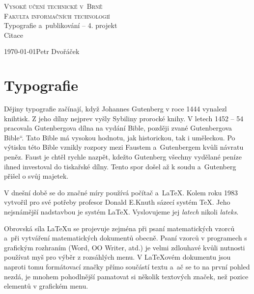 \documentclass[a4paper, 11pt]{article}
\newcommand{\myuv}[1]{\quotedblbase #1\textquotedblleft}
\begin{document}
\begin{titlepage}
\begin{center}
{\Huge  \textsc{Vysoké učení technické v~Brně}} \\ 
\medskip
{\huge \textsc{Fakulta informačních technologií}} \\ 
{\LARGE Typografie a~publikování -- 4. projekt}\\
\medskip
{\Huge Citace}
{}
\end{center}
{\Large { \today \hfill Petr Dvořáček}}\\
\end{titlepage}


\section{Typografie}



Dějiny typografie začínají, když Johannes Gutenberg v roce 1444 vynalezl knihtisk. \citep{Rybicka:Latex} Z jeho dílny nejprev vyšly Sybiliny prorocké knihy. V letech 1452 – 54 pracovala Gutenbergova dílna na vydání Bible, později zvané \myuv{Gutenbergova Bible}. Tato Bible má vysokou hodnotu, jak historickou, tak i uměleckou. Po výtisku této Bible vznikly rozpory mezi Faustem a~Gutenbergem kvůli návratu peněz. Faust je chtěl rychle nazpět, kdežto Gutenberg všechny vydělané peníze ihned investoval do tiskařské dílny. Tento spor došel až k soudu a~Gutenberg přišel o svůj majetek. \citep{Jitka:gutenberg} 

V dnešní době se do značné míry používá počítač a~\LaTeX. \citep{Lamport:Latex} Kolem roku 1983 vytvořil pro své potřeby profesor Donald E.\-Knuth sázecí systém \TeX. Jeho nejsnámější nadstavbou je systém \LaTeX. \citep{Divila:revizni_system}  Vyslovujeme jej \emph{latech} nikoli \emph{lateks}. \citep{Cisza:uvod_do_latexu}  

Obrovská síla LaTeXu se projevuje zejména při psaní matematických vzorců a~při vytváření matematických dokumentů obecně. Psaní vzorců v programech s grafickým rozhraním (Word, OO Writer, atd.) je velmi zdlouhavé kvůli nutnosti používat myš pro výběr z rozsáhlých menu. V LaTeXovém dokumentu jsou naproti tomu formátovací značky přímo součástí textu a~ač se to na první pohled nezdá, je mnohem pohodlnější pamatovat si několik textových značek, než pozice elementů v grafickém menu. \citep{Martinek:Latexove_specialty}
\end{document}
